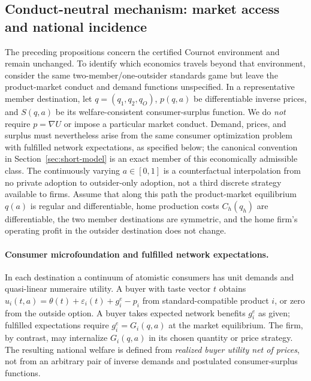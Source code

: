 \subsection{Conduct-neutral mechanism: market access and national incidence}
\label{subsec:general-mechanism}
The preceding propositions concern the certified Cournot environment and
remain unchanged.  To identify which economics travels beyond that
environment, consider the same two-member/one-outsider standards game but
leave the product-market conduct and demand functions unspecified.  In a
representative member destination, let \(q=(q_1,q_2,q_O)\),
\(p(q,a)\) be differentiable inverse prices, and \(S(q,a)\) be its
welfare-consistent consumer-surplus function.  We do \emph{not} require
\(p=\nabla U\) or impose a particular market conduct.  Demand,
prices, and surplus must nevertheless arise from the same consumer
optimization problem with fulfilled network expectations, as specified
below; the canonical convention in Section~\ref{sec:short-model}
is an exact member of this economically admissible class.
The continuously varying \(a\in[0,1]\) is a counterfactual
interpolation from no private adoption to outsider-only adoption, not
a third discrete strategy available to firms.  Assume that along this
path the product-market equilibrium \(q(a)\) is regular and
differentiable, home production costs \(C_h(q_h)\) are differentiable,
the two member destinations are symmetric, and the home firm's
operating profit in the outsider destination does not change.



\paragraph{Consumer microfoundation and fulfilled network expectations.}
In each destination a continuum of atomistic consumers has unit
demands and quasi-linear numeraire utility.  A buyer with taste vector
\(t\) obtains \(u_i(t,a)=\theta(t)+\varepsilon_i(t)+g_i^e-p_i\)
from standard-compatible product \(i\), or zero from the outside
option.  A buyer takes expected network benefits \(g_i^e\) as given;
fulfilled expectations require \(g_i^e=G_i(q,a)\) at the market
equilibrium.  The firm, by contrast, may internalize
\(G_i(q,a)\) in its chosen quantity or price strategy.
The resulting national welfare is defined from \emph{realized
buyer utility net of prices}, not from an arbitrary pair of
inverse demands and postulated consumer-surplus functions.

